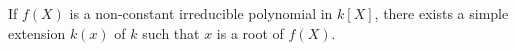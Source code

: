 If $f(X)$ is a non-constant irreducible polynomial in $k[X]$, there exists a simple extension $k(x)$ of $k$ such that $x$ is a root of $f(X)$.
